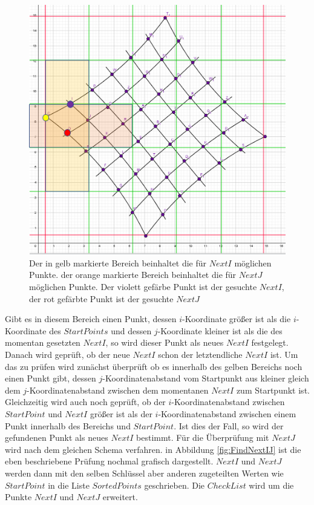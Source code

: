 \begin{figure}[!htb]
	\centering
	\includegraphics[width=0.6\linewidth]{images/VerzeichnetesSchachbrett_2.png}
	\caption[Finden der Startvektoren in Schachbrettpunkten]{Der in gelb markierte Bereich beinhaltet die für $NextI$ möglichen Punkte. der orange markierte Bereich beinhaltet die für $NextJ$ möglichen Punkte. Der violett gefärbe Punkt ist der gesuchte $NextI$, der rot gefärbte Punkt ist der gesuchte $NextJ$}
	\label{fig:NextINextJ}
\end{figure}


Gibt es in diesem Bereich einen Punkt, dessen $i$-Koordinate größer ist als die $i$-Koordinate des $StartPoints$ und dessen $j$-Koordinate kleiner ist als die des momentan gesetzten $NextI$, so wird dieser Punkt als neues $NextI$ festgelegt. Danach wird geprüft, ob der neue $NextI$ schon der letztendliche $NextI$ ist. Um das zu prüfen wird zunächst überprüft ob es innerhalb des gelben Bereichs noch einen Punkt gibt, dessen $j$-Koordinatenabstand vom Startpunkt aus kleiner gleich dem $j$-Koordinatenabstand zwischen dem momentanen $NextI$ zum Startpunkt ist. Gleichzeitig wird auch noch geprüft, ob der $i$-Koordinatenabstand zwischen $StartPoint$ und $NextI$ größer ist als der $i$-Koordinatenabstand zwischen einem Punkt innerhalb des Bereichs und $StartPoint$. Ist dies der Fall, so wird der gefundenen Punkt als neues $NextI$ bestimmt. Für die Überprüfung mit $NextJ$ wird nach dem gleichen Schema verfahren. in Abbildung \ref{fig:FindNextIJ} ist die eben beschriebene Prüfung nochmal grafisch dargestellt. $NextI$ und $NextJ$ werden dann mit den selben Schlüssel aber anderen zugeteilten Werten wie $StartPoint$ in die Liste $SortedPoints$ geschrieben. Die $CheckList$ wird um die Punkte $NextI$ und $NextJ$ erweitert.


